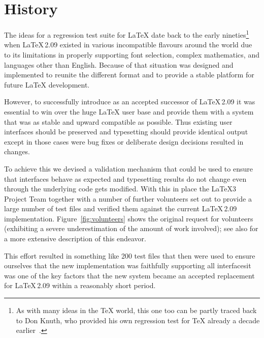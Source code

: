 \documentclass[a4paper]{ltugboat}
\begin{document}
\section{History}

The ideas for a regression test suite for \LaTeX{} date back to the
early nineties\footnote{As with many ideas in the \TeX{} world, this one too
  can be partly traced back to Don Knuth, who provided his own
  regression test for \TeX{} already a decade
  earlier~\cite{Knuth:1984:TTT}.} when \LaTeX\,2.09 existed in various
incompatible flavours around the world due to its limitations in
properly supporting font selection, complex mathematics, and languages
other than English.  Because of that situation \LaTeXe{} was designed
and implemented to reunite the different format and to provide a
stable platform for future \LaTeX{} development.

However, to successfully introduce \LaTeXe{} as an accepted successor
of \LaTeX\,2.09 it was essential to win over the huge \LaTeX{} user
base and provide them with a system that was as stable and upward
compatible as possible. Thus existing user interfaces should be
preserved and typesetting should provide identical output except in
those cases were bug fixes or deliberate design decisions resulted in
changes.

To achieve this
we
devised a validation mechanism that could be used
to ensure that interfaces behave as expected and typesetting results
do not change even through the underlying code gets modified. With
this in place the \LaTeX3 Project Team together with a number of
further volunteers set out to provide a large number of test files and
verified them against the current \LaTeX\,2.09
implementation. Figure~\ref{fig:volunteers} shows the original request
for volunteers (exhibiting a severe underestimation of the amount of
work involved); see also \cite{Mittelbach:TB18-4-309} for a more extensive
description of this endeavor. 

This effort resulted in something like 200 test files
that then were used to ensure ourselves that the new \LaTeXe{}
implementation was faithfully supporting all interfaces\Dash it was one
of the key factors that the new system became an accepted replacement
for \LaTeX\,2.09 within a reasonably short period.
\end{document}
